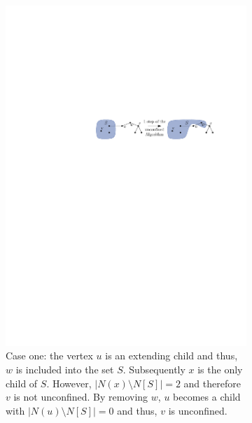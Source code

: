 \documentclass[12pt,a4paper,twoside]{scrartcl}
\numberwithin{equation}{section}
\begin{document}
\begin{figure}[htb]
	\centering
	\captionsetup[subfigure]{aboveskip=1em,belowskip=1em}
	\captionsetup{belowskip=-1em, aboveskip=0em}
	\begin{subfigure}{\textwidth}
		\centering
		\includegraphics[scale=1.5]{images/alm_unconf_1}
		\caption{Case one: the vertex $u$ is an extending child and thus, $w$ is included into the set $S$. Subsequently $x$ is the only child of $S$. However, $|N(x)\setminus N[S]| = 2$ and therefore $v$ is not unconfined. By removing $w$, $u$ becomes a child with $|N(u)\setminus N[S]| = 0$ and thus, $v$ is unconfined.  }
	\end{subfigure}
	\begin{subfigure}{\textwidth}
		\centering

\end{subfigure}
\end{figure}
\end{document}
